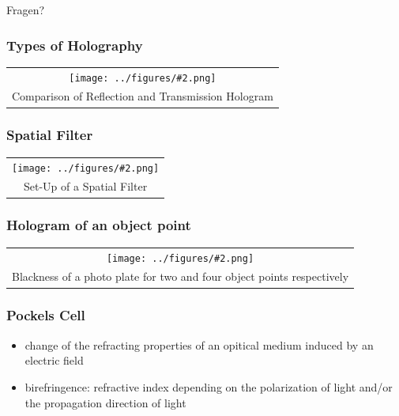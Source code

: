 \documentclass[10pt]{beamer}
\newcommand{\gra}[3][]{
	\begin{table}
	\centering
	\begin{tabular}[width=\textwidth]{c}
		\texttt{[image: ../figures/\#2.png]}\\
		\small #3
	\end{tabular}
	\end{table}
}
\begin{document}
\begin{frame}
	\LARGE{Fragen?}
\end{frame}


\begin{frame}
	\frametitle{Types of Holography}
	\gra[0.5]{Reflex_Transmissions_Hologram}{Comparison of Reflection and Transmission Hologram  \footfullcite{staats}}
\end{frame}

\begin{frame}
	\frametitle{Spatial Filter}
	\gra[0.8]{SpatialFilter}{Set-Up of a Spatial Filter }
\end{frame}

\begin{frame}
	\frametitle{Hologram of an object point}
	\gra[0.5]{obj2}{Blackness of a photo plate for two and four object points respectively \footfullcite{staats}}
\end{frame}

\begin{frame}
	\frametitle{Pockels Cell}
	\begin{itemize}
	\item change of the refracting properties of an opitical medium induced by an electric field
	\item birefringence: refractive index depending on the polarization of light and/or the propagation direction of light
	\end{itemize}
\end{frame}
\end{document}
